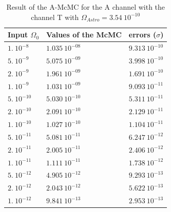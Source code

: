 \documentclass[a4paper,12pt]{article}
\begin{document}
\begin{table}[H]
\begin{center}
\begin{tabular}{|l|l|l|}
\hline
Input $\Omega_0$    & Values of the McMC    & errors ($\sigma$)   \\ \hline
$1. \ 10^{-8}$      & $1.035 \ 10^{-08}$    & $9.313 \ 10^{-10}$  \\ \hline
$5. \ 10^{-9}$      & $5.075 \ 10^{-09}$    & $3.998 \ 10^{-10}$  \\ \hline
$2. \ 10^{-9}$      & $1.961 \ 10^{-09}$    & $1.691 \ 10^{-10}$  \\ \hline
$1. \ 10^{-9}$      & $1.031 \ 10^{-09}$    & $9.093 \ 10^{-11}$  \\ \hline
$5. \ 10^{-10}$     & $5.030 \ 10^{-10}$    & $5.311 \ 10^{-11}$  \\ \hline
$2. \ 10^{-10}$     & $2.091 \ 10^{-10}$    & $2.129 \ 10^{-11}$  \\ \hline
$1. \ 10^{-10}$     & $1.027 \ 10^{-10}$    & $1.104 \ 10^{-11}$  \\ \hline
$5. \ 10^{-11}$     & $5.081 \ 10^{-11}$    & $6.247 \ 10^{-12}$  \\ \hline
$2. \ 10^{-11}$     & $2.005 \ 10^{-11}$    & $2.406 \ 10^{-12}$  \\ \hline
$1. \ 10^{-11}$     & $1.111 \ 10^{-11}$    & $1.738 \ 10^{-12}$  \\ \hline
$5. \ 10^{-12}$     & $4.905 \ 10^{-12}$    & $9.293 \ 10^{-13}$  \\ \hline
$2. \ 10^{-12}$     & $2.043 \ 10^{-12}$    & $5.622 \ 10^{-13}$  \\ \hline
$1. \ 10^{-12}$     & $9.841 \ 10^{-13}$    & $2.953 \ 10^{-13}$  \\ \hline
\end{tabular}
\end{center}
\caption{Result of the A-McMC for the A channel with the channel T with $\Omega_{Astro} = 3.54 \ 10^{-10}$}
\label{table:resultA+T-10}
\end{table}
\end{document}
